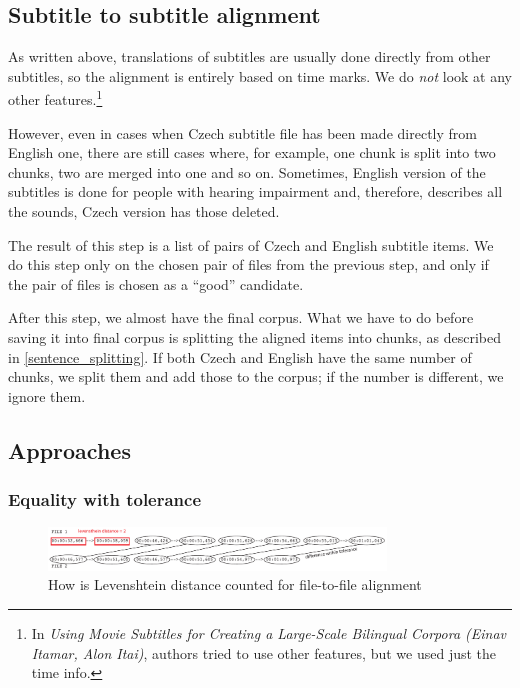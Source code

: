 \subsection{Subtitle to subtitle alignment}
As written above, translations of subtitles are usually done directly from other subtitles, so the alignment is entirely based on time marks. We do \emph{not} look at any other features.\footnote{In \emph{Using Movie Subtitles for Creating a Large-Scale Bilingual Corpora (Einav Itamar, Alon Itai)}, authors tried to use other features, but we used just the time info.}

However, even in cases when Czech subtitle file has been made directly from English one, there are still cases where, for example, one chunk is split into two chunks, two are merged into one and so on. Sometimes, English version of the subtitles is done for people with hearing impairment and, therefore, describes all the sounds, Czech version has those deleted.

The result of this step is a list of pairs of Czech and English subtitle items. We do this step only on the chosen pair of files from the previous step, and only if the pair of files is chosen as a ``good'' candidate.

After this step, we almost have the final corpus. What we have to do before saving it into final corpus is splitting the aligned items into chunks, as described in \ref{sentence_splitting}. If both Czech and English have the same number of chunks, we split them and add those to the corpus; if the number is different, we ignore them.

\subsection{Approaches}
\subsubsection{Equality with tolerance}

\begin{figure}[t]
\begin{center}
\includegraphics[width=0.8\textwidth]{figures/tolerance_priklad.pdf}
\end{center}
\caption{How is Levenshtein distance counted for file-to-file alignment}\label{tolerance}
\end{figure}


